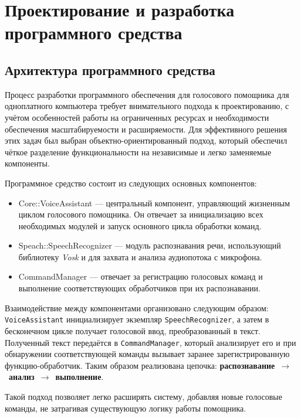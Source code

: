 \section{Проектирование и разработка программного средства}

\subsection{Архитектура программного средства}

Процесс разработки программного обеспечения для голосового помощника для одноплатного компьютера требует внимательного подхода к проектированию, с учётом особенностей работы на ограниченных ресурсах и необходимости обеспечения масштабируемости и расширяемости. Для эффективного решения этих задач был выбран объектно-ориентированный подход, который обеспечил чёткое разделение функциональности на независимые и легко заменяемые компоненты.

Программное средство состоит из следующих основных компонентов:

\begin{itemize}
	\item {Core::VoiceAssistant} — центральный компонент, управляющий жизненным циклом голосового помощника. Он отвечает за инициализацию всех необходимых модулей и запуск основного цикла обработки команд.
	
	\item {Speach::SpeechRecognizer} — модуль распознавания речи, использующий библиотеку \textit{Vosk} и  для захвата и анализа аудиопотока с микрофона.
	
	\item {CommandManager} — отвечает за регистрацию голосовых команд и выполнение соответствующих обработчиков при их распознавании.
\end{itemize}

Взаимодействие между компонентами организовано следующим образом: \texttt{VoiceAssistant} инициализирует экземпляр \texttt{SpeechRecognizer}, а затем в бесконечном цикле получает голосовой ввод, преобразованный в текст. Полученный текст передаётся в \texttt{CommandManager}, который анализирует его и при обнаружении соответствующей команды вызывает заранее зарегистрированную функцию-обработчик. Таким образом реализована цепочка: \textbf{распознавание}~$\rightarrow$~\textbf{анализ}~$\rightarrow$~\textbf{выполнение}.

Такой подход позволяет легко расширять систему, добавляя новые голосовые команды, не затрагивая существующую логику работы помощника.

